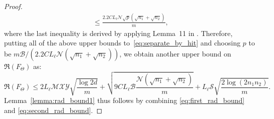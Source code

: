 \documentclass[twoside,11pt]{article}
\def\bx{{\bf x}}
\def\by{{\bf y}}
\newcommand\Ex[2]{{\mathbb E}_{#1}\big[#2\big]}
\def\bmax{{\mathcal B}}
\def\mmax{{\mathcal M}}
\def\nmax{{\mathcal N}}
\def\smax{{\mathcal S}}
\def\xmax{{\mathcal X}}
\def\ymax{{\mathcal Y}}
\def\rad{{\mathfrak R}}
\begin{document}
\begin{proof}
\begin{align*}
  \leq \frac{2.2CL_\ell \nmax \sqrt{p}(\sqrt{n_1} + \sqrt{n_2})}{m},
\end{align*}
where the last inequality is derived by applying Lemma~11 in \citet{Shamir14a}.  %
Therefore, putting all of the above upper bounds to~\eqref{eq:separate_by_hit} and choosing $p$ to be
$m\bmax/(2.2CL_\ell\nmax(\sqrt{n_1}+\sqrt{n_2}))$, we obtain another upper bound on
$\rad(F_{\Theta})$ as:
\begin{equation}
  {\rad(F_{\Theta})} \leq 2L_\ell\mmax \xmax \ymax \sqrt{\frac{\log{2d}}{m}} + \sqrt{9CL_\ell\bmax\frac{\nmax(\sqrt{n_1}+\sqrt{n_2})}{m}}
  +L_\ell\smax \sqrt{\frac{2\log{(2n_1n_2)}}{m}}.
    \label{eq:second_rad_bound}
\end{equation}
Lemma~\ref{lemma:rad_bound1} thus follows by combining \eqref{eq:first_rad_bound} and \eqref{eq:second_rad_bound}.
\end{proof}
\end{document}
